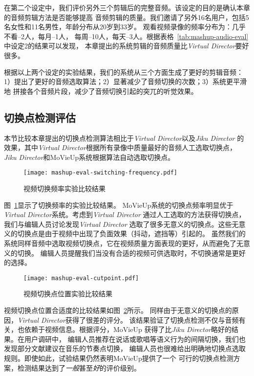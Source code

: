 在第二个设定中，我们评价另外三个剪辑后的完整音频。该设定的目的是确认本章的音频剪辑方法是否能够提高
音频剪辑的质量。我们邀请了另外16名用户，包括5名女性和11名男性，年龄分布从20岁到33岁。
观看视频录像的频率分布为：几乎不看--2人，每月--1人，
每周--10人，每天--3人。根据表格~\ref{tab:mashup-audio-eval}中设定2的结果可以发现，
本章提出的系统剪辑的音频质量比\emph{Virtual Director}要好很多。

根据以上两个设定的实验结果，我们的系统从三个方面生成了更好的剪辑音频：
1）提出了更好的音频选取算法；2）显著减少了音频切换的次数；3）系统更平滑地
拼接各个音频片段，减少了音频切换引起的突兀的听觉效果。

\subsection{切换点检测评估}
本节比较本章提出的切换点检测算法相比于\emph{Virtual Director}以及\emph{Jiku Director}
的效果，其中\emph{Virtual Director}根据所有录像中质量最好的音频人工选取切换点，
\emph{Jiku Director}和MoVieUp系统根据算法自动选取切换点。

\begin{figure}[ht]
    \centering
    \texttt{[image: mashup-eval-switching-frequency.pdf]}
    \caption{视频切换频率实验比较结果}
    \label{fig:mashup-eval-switching-frequency}
\end{figure}
图~\ref{fig:mashup-eval-switching-frequency}显示了切换频率的实验比较结果。
MoVieUp系统的切换点频率明显优于\emph{Virtual Director}系统。考虑到\emph{Virtual Director}
通过人工选取的方法获得切换点，我们与编辑人员讨论发现\emph{Virtual Director}
选取了很多无意义的切换点。这些无意义的切换点是由于视频中出现了负面效果（抖动，遮挡等）引起的。
虽然我们的系统同样音频中选取视频切换点，它在视频质量方面表现的更好，从而避免了无意义的切换。
编辑人员提醒我们当没有合适的视频可供选取时，不切换通常是更好的选择。

\begin{figure}[ht]
    \centering
    \texttt{[image: mashup-eval-cutpoint.pdf]}
    \caption{视频切换点位置实验比较结果}
    \label{fig:mashup-eval-cutpoint}
\end{figure}
视频切换点位置合适度的比较结果如图~\ref{fig:mashup-eval-cutpoint}所示。
同样由于无意义的切换点的原因，\emph{Virtual Director}获得了很差的评分。
该结果验证了切换点检测不仅与音频有关，也依赖于视频信息。根据评分，MoVieUp
获得了比\emph{Jiku Director}略好的结果。在用户调研中，
编辑人员推荐在说话或歌唱等语义行为的间隔切换，我们也发现部分文献建议在音乐的节奏点切换，
编辑人员也很难给出明确地切换点选取规则。即使如此，试验结果仍然表明MoVieUp提供了一个
可行的切换点检测方案，检测结果达到了\emph{一般}甚至\emph{好}的评价级别。

